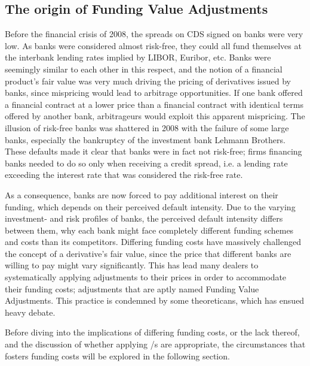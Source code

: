 \documentclass[../../../main.tex]{subfiles}
\begin{document}
    \subsection{The origin of Funding Value Adjustments}
        Before the financial crisis of 2008, the spreads on CDS signed on banks were very low. 
        As banks were considered almost risk-free, 
        they could all fund themselves at the interbank lending rates implied by LIBOR, Euribor, etc.
        Banks were seemingly similar to each other in this respect, 
        and the notion of a financial product's fair value was very much driving the pricing of derivatives issued by banks,
        since mispricing would lead to arbitrage opportunities.
        If one bank offered a financial contract at a lower price than a financial contract with identical terms
        offered by another bank, arbitrageurs would exploit this apparent mispricing. 
        The illusion of risk-free banks was shattered in 2008 with the failure of some large banks, 
        especially the bankruptcy of the investment bank Lehmann Brothers.
        These defaults made it clear that banks were in fact not risk-free; 
        firms financing banks needed to do so only when receiving a credit spread,
        i.e. a lending rate exceeding the interest rate that was considered the risk-free rate. 
        
        As a consequence, banks are now forced to pay additional interest on their funding, 
        which depends on their perceived default intensity.
        Due to the varying investment- and risk profiles of banks, 
        the perceived default intensity differs between them, 
        why each bank might face completely different funding schemes and costs than its competitors.
        Differing funding costs have massively challenged the concept of a derivative's fair value,
        since the price that different banks are willing to pay might vary significantly. 
        This has lead many dealers to systematically applying adjustments to their prices
        in order to accommodate their funding costs; 
        adjustments that are aptly named Funding Value Adjustments. 
        This practice is condemned by some theoreticans, 
        which has ensued heavy debate.
        
        Before diving into the implications of differing funding costs, or the lack thereof,
        and the discussion of whether applying \FVA/s are appropriate,
        the circumstances that fosters funding costs will be explored in the following section.
\end{document}
